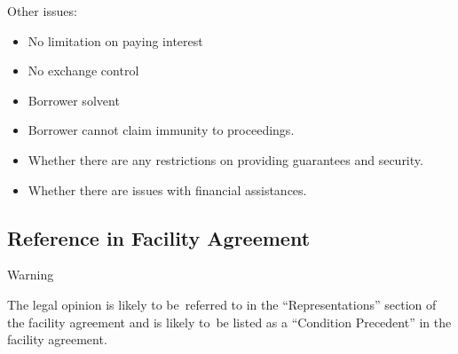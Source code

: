 \documentclass[
]{article}
\providecommand{\tightlist}{%
  \setlength{\itemsep}{0pt}\setlength{\parskip}{0pt}}
\newenvironment{env-31409176-8a91-46bb-85fd-48f2d6a04234}
{
    \savenotes\tcolorbox[blanker,breakable,left=5pt,borderline west={2pt}{-4pt}{orange}]
}
{
    \endtcolorbox\spewnotes
}
\begin{document}
Other issues:

\begin{itemize}
\tightlist
\item
  No limitation on paying interest
\item
  No exchange control
\item
  Borrower solvent
\item
  Borrower cannot claim immunity to proceedings.
\item
  Whether there are any restrictions on providing guarantees and
  security.
\item
  Whether there are issues with financial assistances.
\end{itemize}

\hypertarget{reference-in-facility-agreement}{%
\subsection{Reference in Facility
Agreement}\label{reference-in-facility-agreement}}

\begin{env-31409176-8a91-46bb-85fd-48f2d6a04234}

Warning

The legal opinion is likely to be~referred to in the ``Representations''
section of the facility agreement and is likely to~be listed as a
``Condition Precedent'' in the facility agreement.

\end{env-31409176-8a91-46bb-85fd-48f2d6a04234}
\end{document}
